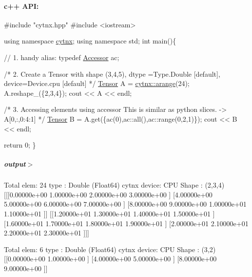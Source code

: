 \paragraph*{c++ A\+PI\+:}


\begin{DoxyCodeInclude}
\textcolor{preprocessor}{#include "cytnx.hpp"}
\textcolor{preprocessor}{#include <iostream>}


\textcolor{keyword}{using namespace }\hyperlink{namespacecytnx}{cytnx};
\textcolor{keyword}{using namespace }std;
\textcolor{keywordtype}{int} main()\{ 
    
    \textcolor{comment}{// 1. handy alias:}
    \textcolor{keyword}{typedef} \hyperlink{classcytnx_1_1Accessor}{Accessor} ac;
    

    \textcolor{comment}{/*}
\textcolor{comment}{        2. Create a Tensor with }
\textcolor{comment}{        shape (3,4,5),}
\textcolor{comment}{        dtype =Type.Double [default],}
\textcolor{comment}{        device=Device.cpu [default]}
\textcolor{comment}{    */}
    \hyperlink{classcytnx_1_1Tensor}{Tensor} A = \hyperlink{namespacecytnx_a733f9931141463bc8b7c61931ccf52c3}{cytnx::arange}(24);
    A.reshape\_(\{2,3,4\});
    cout << A << endl;


    \textcolor{comment}{/*}
\textcolor{comment}{        3. Accessing elements using accessor}
\textcolor{comment}{        This is similar as python slices. }
\textcolor{comment}{        -> A[0,:,0:4:1]}
\textcolor{comment}{    */}
    \hyperlink{classcytnx_1_1Tensor}{Tensor} B = A.get(\{ac(0),ac::all(),ac::range(0,2,1)\});
    cout << B << endl;


    \textcolor{keywordflow}{return} 0;
\}

\end{DoxyCodeInclude}
 \subparagraph*{output$>$}


\begin{DoxyVerbInclude}

Total elem: 24
type  : Double (Float64)
cytnx device: CPU
Shape : (2,3,4)
[[[0.00000e+00 1.00000e+00 2.00000e+00 3.00000e+00 ]
  [4.00000e+00 5.00000e+00 6.00000e+00 7.00000e+00 ]
  [8.00000e+00 9.00000e+00 1.00000e+01 1.10000e+01 ]]
 [[1.20000e+01 1.30000e+01 1.40000e+01 1.50000e+01 ]
  [1.60000e+01 1.70000e+01 1.80000e+01 1.90000e+01 ]
  [2.00000e+01 2.10000e+01 2.20000e+01 2.30000e+01 ]]]



Total elem: 6
type  : Double (Float64)
cytnx device: CPU
Shape : (3,2)
[[0.00000e+00 1.00000e+00 ]
 [4.00000e+00 5.00000e+00 ]
 [8.00000e+00 9.00000e+00 ]]


\end{DoxyVerbInclude}
